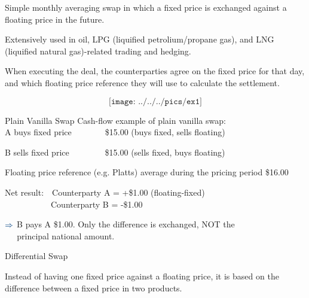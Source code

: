 	Simple monthly averaging swap in which a fixed price is exchanged against a floating price in the future.


	Extensively used in oil, LPG (liquified petrolium/propane gas), and LNG (liquified natural gas)-related trading and hedging.


	When executing the deal, the counterparties agree on the fixed price for that day, and which floating price reference they will use to calculate the settlement.


	
$$\texttt{[image: ../../../pics/ex1]}$$





{Plain Vanilla Swap}
\textcolor[rgb]{0.00,0.25,0.50}{Cash-flow example of plain vanilla swap:}\\






	
A buys fixed price$\qquad\qquad$\$15.00 (buys fixed, sells floating)


	B sells fixed price$\qquad\qquad\;$\$15.00 (sells fixed, buys floating)


	
Floating price reference (e.g. Platts) average during the pricing period \$16.00


	
\vspace{0.3cm}
\textcolor[rgb]{0.00,0.25,0.50}{Net result:}$\quad$Counterparty A = +\$1.00 (floating-fixed)\\
$\qquad\qquad\quad\,$  Counterparty B = -\$1.00


	
$\textcolor[rgb]{0.00,0.25,0.50}{\Rightarrow}$ B pays A \$1.00. Only the difference is exchanged, NOT the \\
$\quad\;\,$principal national amount.






{Differential Swap}






	Instead of having one fixed price against a floating price, it is based on the difference between a fixed price in two products.


